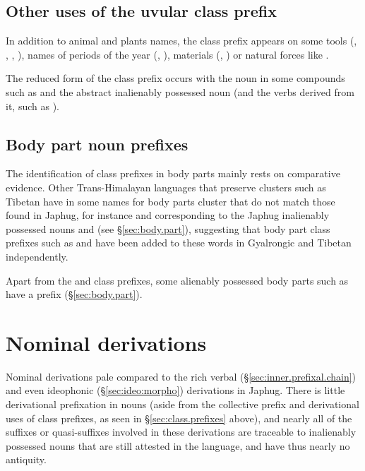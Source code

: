 \subsection{Other uses of the uvular class prefix} \label{sec:uvular.other}
In addition to animal and plants names, the class prefix  appears on some tools (, , , 
), names of periods of the year (, ), materials (, ) or natural forces like .

The reduced form  of the class prefix occurs with the noun  in some compounds such as  and the abstract inalienably possessed noun  (and the verbs derived from it, such as ).
 
\subsection{Body part noun prefixes} \label{ex:body.part.prefix}
The identification of class prefixes in body parts mainly rests on comparative evidence. Other Trans-Himalayan languages that preserve clusters such as Tibetan have in some names for body parts cluster that do not match those found in Japhug, for instance  and  corresponding to the Japhug inalienably possessed nouns  and  (see §\ref{sec:body.part}), suggesting that body part class prefixes such as  and  have been added to these words in Gyalrongic and Tibetan independently.

Apart from the  and  class prefixes, some alienably possessed body parts such as  have a  prefix (§\ref{sec:body.part}).

\section{Nominal derivations}
Nominal derivations pale compared to the rich verbal (§\ref{sec:inner.prefixal.chain}) and even ideophonic (§\ref{sec:ideo:morpho}) derivations in Japhug. There is little derivational prefixation in nouns (aside from the collective  prefix and derivational uses of class prefixes, as seen in §\ref{sec:class.prefixes} above), and nearly all of the suffixes or quasi-suffixes involved in these derivations are traceable to inalienably possessed nouns that are still attested in the language, and have thus nearly no antiquity. 

